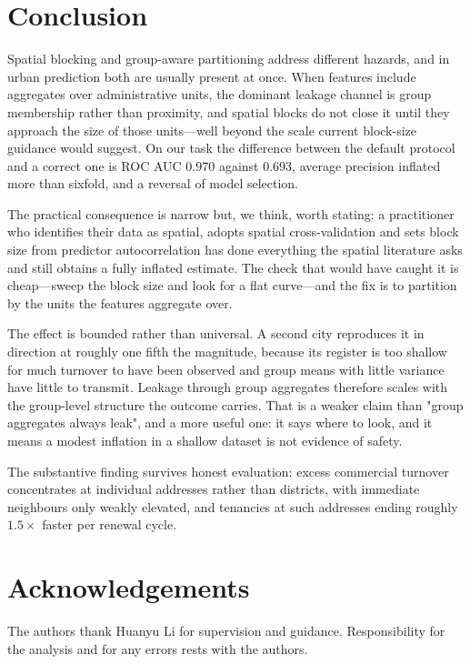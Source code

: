 \documentclass[11pt]{article}
\begin{document}
\section{Conclusion}

Spatial blocking and group-aware partitioning address different hazards, and in
urban prediction both are usually present at once. When features include
aggregates over administrative units, the dominant leakage channel is group
membership rather than proximity, and spatial blocks do not close it until they
approach the size of those units---well beyond the scale current block-size
guidance would suggest. On our task the difference between the default protocol
and a correct one is ROC AUC $0.970$ against $0.693$, average precision inflated
more than sixfold, and a reversal of model selection.

The practical consequence is narrow but, we think, worth stating: a practitioner
who identifies their data as spatial, adopts spatial cross-validation and sets
block size from predictor autocorrelation has done everything the spatial
literature asks and still obtains a fully inflated estimate. The check that would
have caught it is cheap---sweep the block size and look for a flat curve---and
the fix is to partition by the units the features aggregate over.

The effect is bounded rather than universal. A second city reproduces it in
direction at roughly one fifth the magnitude, because its register is too
shallow for much turnover to have been observed and group means with little
variance have little to transmit. Leakage through group aggregates therefore
scales with the group-level structure the outcome carries. That is a weaker
claim than "group aggregates always leak", and a more useful one: it says where
to look, and it means a modest inflation in a shallow dataset is not evidence of
safety.

The substantive finding survives honest evaluation: excess commercial turnover
concentrates at individual addresses rather than districts, with immediate
neighbours only weakly elevated, and tenancies at such addresses ending roughly
$1.5\times$ faster per renewal cycle.

\section*{Acknowledgements}

The authors thank Huanyu Li for supervision and guidance. Responsibility for the
analysis and for any errors rests with the authors.
\end{document}
